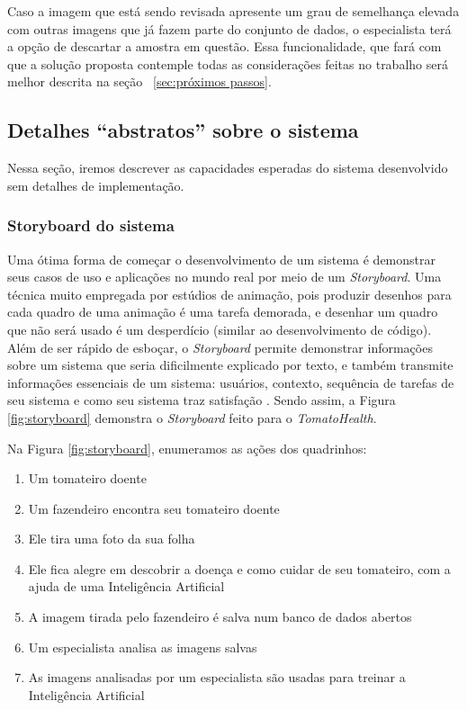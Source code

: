 Caso a imagem que está sendo revisada apresente um grau de semelhança elevada com outras imagens que já fazem parte do conjunto de dados, o especialista terá a opção de descartar a amostra em questão. Essa funcionalidade, que fará com que a solução proposta contemple todas as considerações feitas no trabalho será melhor descrita na seção ~\ref{sec:próximos passos}.

\subsection{{Detalhes ``abstratos'' sobre o sistema} \label{sec:abst-det}}

Nessa seção, iremos descrever as capacidades esperadas do sistema desenvolvido sem detalhes de implementação.

\subsubsection{{Storyboard do sistema}}

Uma ótima forma de começar o desenvolvimento de um sistema é demonstrar seus casos de uso e aplicações no mundo real por meio de um \textit{Storyboard}. Uma técnica muito empregada por estúdios de animação, pois produzir desenhos para cada quadro de uma animação é uma tarefa demorada, e desenhar um quadro que não será usado é um desperdício (similar ao desenvolvimento de código). Além de ser rápido de esboçar, o \textit{Storyboard} permite demonstrar informações sobre um sistema que seria dificilmente explicado por texto, e também transmite informações essenciais de um sistema: usuários, contexto, sequência de tarefas de seu sistema e como seu sistema traz satisfação \citep{klemmer2016}. Sendo assim, a Figura \ref{fig:storyboard} demonstra o \textit{Storyboard} feito para o \emph{TomatoHealth}.

Na Figura \ref{fig:storyboard}, enumeramos as ações dos quadrinhos:

\begin{enumerate}
    \item Um tomateiro doente
    \item Um fazendeiro encontra seu tomateiro doente
    \item Ele tira uma foto da sua folha
    \item Ele fica alegre em descobrir a doença e como cuidar de seu tomateiro, com a ajuda de uma Inteligência Artificial
    \item A imagem tirada pelo fazendeiro é salva num banco de dados abertos
    \item Um especialista analisa as imagens salvas
    \item As imagens analisadas por um especialista são usadas para treinar a Inteligência Artificial
\end{enumerate}

